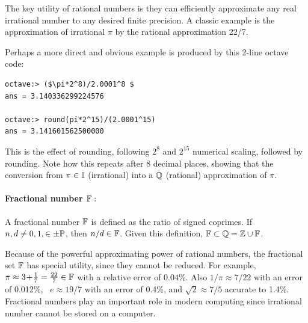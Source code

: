 \documentclass{ximera}
\begin{document}
The key utility of rational numbers is they can efficiently approximate any real irrational number to any desired finite precision.
A classic example is the approximation of irrational $\pi$ by the rational approximation 22/7.

Perhaps a more direct and obvious example is produced by this 2-line octave code:
\begin{center}
\begin{verbatim}
octave:> ($\pi*2^8)/2.0001^8 $
ans = 3.140336299224576

octave:> round(pi*2^15)/(2.0001^15)
ans = 3.141601562500000
\end{verbatim}
\end{center}
This is the effect of rounding, following $2^8$ and $2^{15}$ numerical scaling, followed by rounding.
Note how this repeats after 8 decimal places, showing that the conversion from $\pi\in\I$ (irrational)
into a $\Q$ (rational) approximation of $\pi$.

 

\paragraph{Fractional number $\F:$ \label{page:bbF} }
A fractional number $\F$ is defined as the ratio of signed coprimes. If $n, d \ne 0, 1, \in \pm\P$, then $n/d \in\F$.
Given this definition, $\F\subset\Q = \Z \cup \F$. 

Because of the powerful approximating power of rational numbers, the fractional set $\F$ has special utility,
since they cannot be reduced.
For example, $\pi \approx 3\!+\!\frac{1}{7} = \frac{22}{7}\in \F$ with a relative error of $0.04$\%.
Also  $1/\pi\approx 7/22$ with an error of 0.012\%, ~$e \approx 19/7$ {with an error of} 0.4\%,
and $\sqrt{2}\approx 7/5$ accurate to 1.4\%.
Fractional numbers play an important role in modern computing since irrational number cannot be stored on a computer.
  
\end{document}
